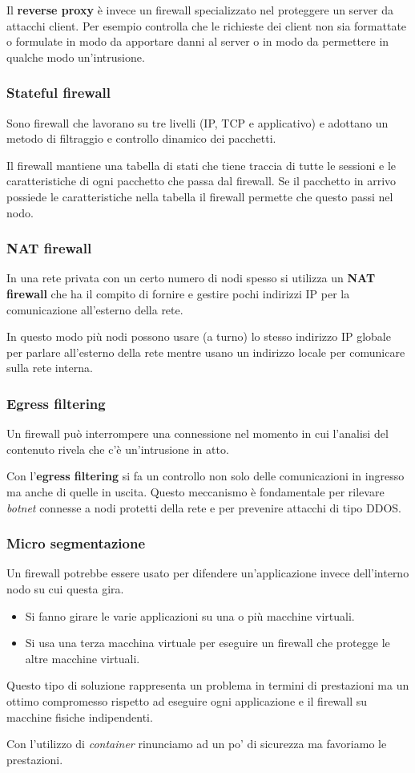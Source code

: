 Il \textbf{reverse proxy} è invece un firewall specializzato nel proteggere un server da attacchi client. Per esempio
controlla che le richieste dei client non sia formattate o formulate in modo da apportare danni al server o in modo da
permettere in qualche modo un'intrusione.

\subsubsection{Stateful firewall}
Sono firewall che lavorano su tre livelli (IP, TCP e applicativo) e adottano un metodo di filtraggio e controllo
dinamico dei pacchetti.

Il firewall mantiene una tabella di stati che tiene traccia di tutte le sessioni e le caratteristiche di ogni pacchetto
che passa dal firewall. Se il pacchetto in arrivo possiede le caratteristiche nella tabella il firewall permette che
questo passi nel nodo.

\subsubsection{NAT firewall}
In una rete privata con un certo numero di nodi spesso si utilizza un \textbf{NAT firewall} che ha il compito di
fornire e gestire pochi indirizzi IP per la comunicazione all'esterno della rete.

In questo modo più nodi possono usare (a turno) lo stesso indirizzo IP globale per parlare all'esterno della rete mentre
usano un indirizzo locale per comunicare sulla rete interna.

\subsubsection{Egress filtering}
Un firewall può interrompere una connessione nel momento in cui l'analisi del contenuto rivela che c'è un'intrusione in
atto.

Con l'\textbf{egress filtering} si fa un controllo non solo delle comunicazioni in ingresso ma anche di quelle in
uscita. Questo meccanismo è fondamentale per rilevare \emph{botnet} connesse a nodi protetti della rete e per prevenire
attacchi di tipo DDOS.

\subsubsection{Micro segmentazione}
Un firewall potrebbe essere usato per difendere un'applicazione invece dell'interno nodo su cui questa gira.
\begin{itemize}
	\item Si fanno girare le varie applicazioni su una o più macchine virtuali.
	\item Si usa una terza macchina virtuale per eseguire un firewall che protegge le altre macchine virtuali.
\end{itemize}
Questo tipo di soluzione rappresenta un problema in termini di prestazioni ma un ottimo compromesso rispetto ad
eseguire ogni applicazione e il firewall su macchine fisiche indipendenti.

Con l'utilizzo di \emph{container} rinunciamo ad un po' di sicurezza ma favoriamo le prestazioni.